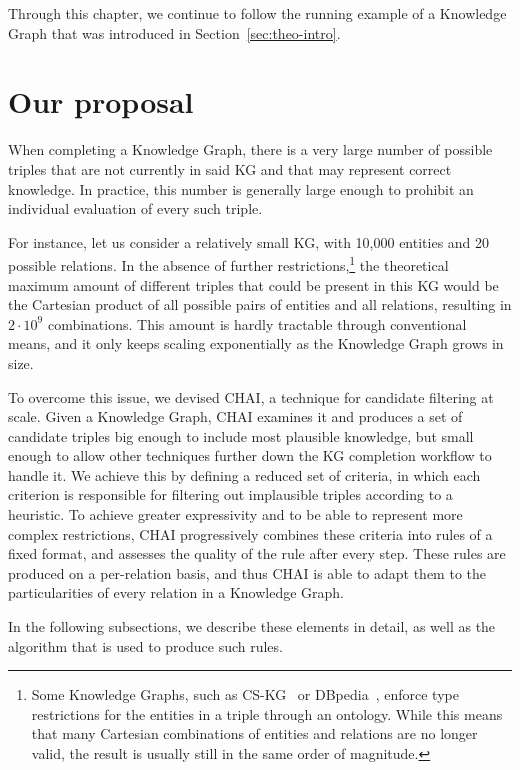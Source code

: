 Through this chapter, we continue to follow the running example of a Knowledge Graph that was introduced in Section~\ref{sec:theo-intro}.

\section{Our proposal}\label{sec:chai-proposal}
When completing a Knowledge Graph, there is a very large number of possible triples that are not currently in said KG and that may represent correct knowledge. In practice, this number is generally large enough to prohibit an individual evaluation of every such triple.

For instance, let us consider a relatively small KG, with 10,000 entities and 20 possible relations. In the absence of further restrictions,\footnote{Some Knowledge Graphs, such as CS-KG~\cite{dessi2022cskg} or DBpedia~\cite{lehmann2015dbpedia}, enforce type restrictions for the entities in a triple through an ontology. While this means that many Cartesian combinations of entities and relations are no longer valid, the result is usually still in the same order of magnitude.} the theoretical maximum amount of different triples that could be present in this KG would be the Cartesian product of all possible pairs of entities and all relations, resulting in $2 \cdot 10^9$ combinations. This amount is hardly tractable through conventional means, and it only keeps scaling exponentially as the Knowledge Graph grows in size.

To overcome this issue, we devised CHAI, a technique for candidate filtering at scale. Given a Knowledge Graph, CHAI examines it and produces a set of candidate triples big enough to include most plausible knowledge, but small enough to allow other techniques further down the KG completion workflow to handle it. We achieve this by defining a reduced set of criteria, in which each criterion is responsible for filtering out implausible triples according to a heuristic. To achieve greater expressivity and to be able to represent more complex restrictions, CHAI progressively combines these criteria into rules of a fixed format, and assesses the quality of the rule after every step. These rules are produced on a per-relation basis, and thus CHAI is able to adapt them to the particularities of every relation in a Knowledge Graph.

In the following subsections, we describe these elements in detail, as well as the algorithm that is used to produce such rules.


